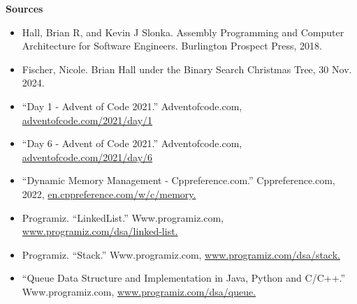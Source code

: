 \documentclass[twoside]{article}
\begin{document}
\noindent \textbf{\Large Sources} \\
\begin{itemize}
    \item Hall, Brian R, and Kevin J Slonka. Assembly Programming and Computer Architecture for Software Engineers. Burlington Prospect Press, 2018.
    \item Fischer, Nicole. Brian Hall under the Binary Search Christmas Tree, 30 Nov. 2024.
    \item “Day 1 - Advent of Code 2021.” Adventofcode.com, \href{https://adventofcode.com/2021/day/1}{adventofcode.com/2021/day/1}
    \item “Day 6 - Advent of Code 2021.” Adventofcode.com, \href{https://adventofcode.com/2021/day/6}{adventofcode.com/2021/day/6}
    \item “Dynamic Memory Management - Cppreference.com.” Cppreference.com, 2022, \href{https://en.cppreference.com/w/c/memory}{en.cppreference.com/w/c/memory.} 
    \item Programiz. “LinkedList.” Www.programiz.com, \href{https://www.programiz.com/dsa/linked-list}{www.programiz.com/dsa/linked-list.}
    \item Programiz. “Stack.” Www.programiz.com, \href{https://www.programiz.com/dsa/stack}{www.programiz.com/dsa/stack.}
    \item “Queue Data Structure and Implementation in Java, Python and C/C++.” Www.programiz.com, \href{https://www.programiz.com/dsa/queue}{www.programiz.com/dsa/queue.} 
\end{itemize}
\end{document}
